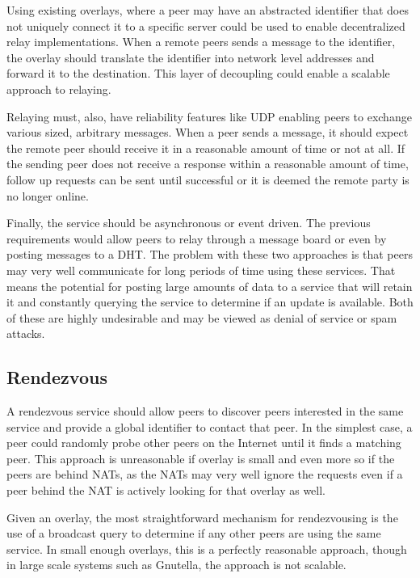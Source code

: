 \documentclass[conference]{IEEEtran}
\begin{document}
Using existing overlays, where a peer may have an abstracted identifier that
does not uniquely connect it to a specific server could be used to enable
decentralized relay implementations.  When a remote peers sends a message to
the identifier, the overlay should translate the identifier into network level
addresses and forward it to the destination.  This layer of decoupling could
enable a scalable approach to relaying.  

Relaying must, also, have reliability features like UDP enabling peers to
exchange various sized, arbitrary messages.  When a peer sends a message, it
should expect the remote peer should receive it in a reasonable amount of time
or not at all.  If the sending peer does not receive a response within a
reasonable amount of time, follow up requests can be sent until successful or
it is deemed the remote party is no longer online.  

Finally, the service should be asynchronous or event driven.  The previous
requirements would allow peers to relay through a message board or even by
posting messages to a DHT.  The problem with these two approaches is that peers
may very well communicate for long periods of time using these services.  That
means the potential for posting large amounts of data to a service that will
retain it and constantly querying the service to determine if an update is
available.  Both of these are highly undesirable and may be viewed as denial of
service or spam attacks.

\subsection{Rendezvous}

A rendezvous service should allow peers to discover peers interested in the
same service and provide a global identifier to contact that peer.  In the
simplest case, a peer could randomly probe other peers on the Internet until it
finds a matching peer.  This approach is unreasonable if overlay is small and
even more so if the peers are behind NATs, as the NATs may very well ignore the
requests even if a peer behind the NAT is actively looking for that overlay as
well.

Given an overlay, the most straightforward mechanism for rendezvousing is the
use of a broadcast query to determine if any other peers are using the same
service.  In small enough overlays, this is a perfectly reasonable approach,
though in large scale systems such as Gnutella, the approach is not scalable.
\end{document}
